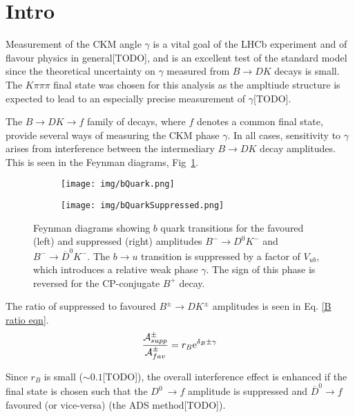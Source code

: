 \documentclass[note.tex]{subfiles}
\begin{document}
\section{Intro}
Measurement of the CKM angle $\gamma$ is a vital goal of the LHCb experiment and of flavour physics in general[TODO],
and is an excellent test of the standard model since the theoretical uncertainty on $\gamma$ measured from $B\rightarrow DK$ decays is small.
The $K\pi\pi\pi$ final state was chosen for this analysis as the ampltiude structure is expected to lead to an especially precise measurement of $\gamma$[TODO].

The $B \rightarrow DK \rightarrow f$ family of decays, where $f$ denotes a common final state,
provide several ways of measuring the CKM phase $\gamma$. In all cases, sensitivity to
$\gamma$ arises from interference between the intermediary $B \rightarrow DK$ decay amplitudes.
This is seen in the Feynman diagrams, Fig~\ref{fig:bucs}.

\begin{figure}[htb!]
    \begin{subfigure}[t]{0.5\linewidth}
        \centering
        \texttt{[image: img/bQuark.png]}
    \end{subfigure}
    \begin{subfigure}[t]{0.5\linewidth}
        \centering
        \texttt{[image: img/bQuarkSuppressed.png]}
    \end{subfigure}
    \caption{Feynman diagrams showing $b$ quark transitions for the favoured (left) and suppressed (right) amplitudes $B^-\rightarrow D^0 K^-$ and $B^-\rightarrow \overline{D}^0 K^-$.
        The $b\rightarrow u$ transition is suppressed by a factor of $V_{ub}$, which introduces a relative weak phase $\gamma$.
        The sign of this phase is reversed for the CP-conjugate $B^+$ decay.}
    \label{fig:bucs}
\end{figure}

The ratio of suppressed to favoured $B^\pm \rightarrow DK^\pm$ amplitudes is seen in Eq. \ref{B ratio eqn}.
\begin{equation}
    \label{B ratio eqn}
    \frac{\mathcal{A}^\pm_{supp}}{\mathcal{A}^\pm_{fav}}= r_B{\rm e}^{\delta_B \pm \gamma}
\end{equation}

Since $r_B$ is small ($\sim 0.1$[TODO]), the overall interference effect is enhanced if the final state is chosen such that the $D^0\
\rightarrow f$ amplitude is suppressed and $\overline{D}^0\rightarrow f$ favoured (or vice-versa) (the ADS method[TODO]).
\end{document}
